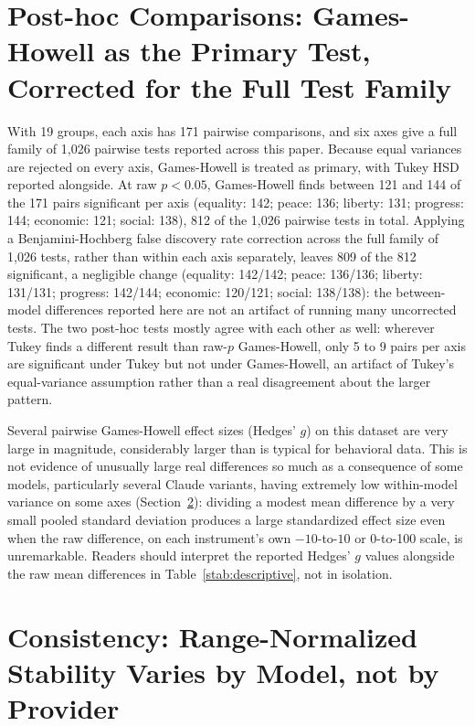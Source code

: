 \documentclass[11pt]{article}
\begin{document}
\section{Post-hoc Comparisons: Games-Howell as the Primary Test, Corrected for the Full Test Family}

With 19 groups, each axis has 171 pairwise comparisons, and six axes give a full
family of 1{,}026 pairwise tests reported across this paper. Because equal
variances are rejected on every axis, Games-Howell is treated as primary, with
Tukey HSD reported alongside. At raw $p<0.05$, Games-Howell finds between 121 and
144 of the 171 pairs significant per axis (equality: 142; peace: 136; liberty: 131;
progress: 144; economic: 121; social: 138), 812 of the 1{,}026 pairwise tests in
total. Applying a Benjamini-Hochberg false discovery rate correction across the
full family of 1{,}026 tests, rather than within each axis separately, leaves 809
of the 812 significant, a negligible change (equality: 142/142; peace: 136/136;
liberty: 131/131; progress: 142/144; economic: 120/121; social: 138/138): the
between-model differences reported here are not an artifact of running many
uncorrected tests. The two post-hoc tests mostly agree with each other as well:
wherever Tukey finds a different result than raw-$p$ Games-Howell, only 5 to 9
pairs per axis are significant under Tukey but not under Games-Howell, an artifact
of Tukey's equal-variance assumption rather than a real disagreement about the
larger pattern.

Several pairwise Games-Howell effect sizes (Hedges' $g$) on this dataset are very
large in magnitude, considerably larger than is typical for behavioral data. This
is not evidence of unusually large real differences so much as a consequence of
some models, particularly several Claude variants, having extremely low
within-model variance on some axes (Section~\ref{si:consistency}): dividing a
modest mean difference by a very small pooled standard deviation produces a large
standardized effect size even when the raw difference, on each instrument's own
$-10$-to-$10$ or 0-to-100 scale, is unremarkable. Readers should interpret the
reported Hedges' $g$ values alongside the raw mean differences in
Table~\ref{stab:descriptive}, not in isolation.

\section{Consistency: Range-Normalized Stability Varies by Model, not by Provider}
\label{si:consistency}
\end{document}
